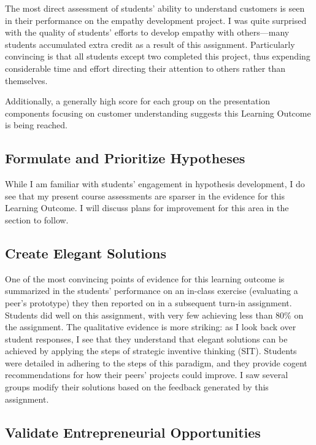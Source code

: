 \documentclass[11pt,article,oneside]{memoir}
\begin{document}
The most direct assessment of students' ability to understand customers
is seen in their performance on the empathy development project. I was
quite surprised with the quality of students' efforts to develop empathy
with others---many students accumulated extra credit as a result of this
assignment. Particularly convincing is that all students except two
completed this project, thus expending considerable time and effort
directing their attention to others rather than themselves.

Additionally, a generally high score for each group on the presentation
components focusing on customer understanding suggests this Learning
Outcome is being reached.

\subsection{Formulate and Prioritize
Hypotheses}\label{formulate-and-prioritize-hypotheses-1}

While I am familiar with students' engagement in hypothesis development,
I do see that my present course assessments are sparser in the evidence
for this Learning Outcome. I will discuss plans for improvement for this
area in the section to follow.

\subsection{Create Elegant Solutions}\label{create-elegant-solutions-1}

One of the most convincing points of evidence for this learning outcome
is summarized in the students' performance on an in-class exercise
(evaluating a peer's prototype) they then reported on in a subsequent
turn-in assignment. Students did well on this assignment, with very few
achieving less than 80\% on the assignment. The qualitative evidence is
more striking: as I look back over student responses, I see that they
understand that elegant solutions can be achieved by applying the steps
of strategic inventive thinking (SIT). Students were detailed in
adhering to the steps of this paradigm, and they provide cogent
recommendations for how their peers' projects could improve. I saw
several groups modify their solutions based on the feedback generated by
this assignment.

\subsection{Validate Entrepreneurial
Opportunities}\label{validate-entrepreneurial-opportunities-1}
\end{document}
